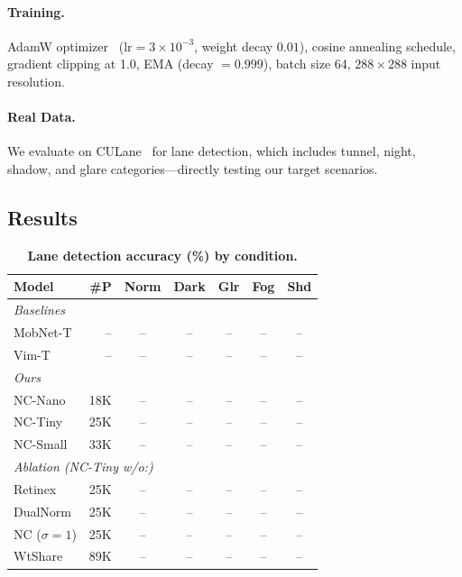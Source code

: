 \documentclass[10pt,twocolumn,letterpaper]{article}
\begin{document}
\paragraph{Training.}
AdamW optimizer~\cite{loshchilov2019decoupled} ($\text{lr}=3 \times 10^{-3}$, weight decay $0.01$), cosine annealing schedule, gradient clipping at 1.0, EMA (decay $= 0.999$), batch size 64, $288 \times 288$ input resolution.

\paragraph{Real Data.}
We evaluate on CULane~\cite{pan2018culane} for lane detection, which includes tunnel, night, shadow, and glare categories---directly testing our target scenarios.

\subsection{Results}

\begin{table}[t]
\centering
\caption{\textbf{Lane detection accuracy (\%) by condition.}}
\label{tab:lane_results}
\setlength{\tabcolsep}{3pt}
\footnotesize
\begin{tabular}{@{}lr ccccc@{}}
\toprule
\textbf{Model} & \textbf{\#P} & \textbf{Norm} & \textbf{Dark} & \textbf{Glr} & \textbf{Fog} & \textbf{Shd} \\
\midrule
\multicolumn{7}{l}{\textit{Baselines}} \\
MobNet-T & -- & -- & -- & -- & -- & -- \\
Vim-T & -- & -- & -- & -- & -- & -- \\
\midrule
\multicolumn{7}{l}{\textit{Ours}} \\
NC-Nano  & 18K & -- & -- & -- & -- & -- \\
NC-Tiny  & 25K & -- & -- & -- & -- & -- \\
NC-Small & 33K & -- & -- & -- & -- & -- \\
\midrule
\multicolumn{7}{l}{\textit{Ablation (NC-Tiny w/o:)}} \\
\;Retinex & 25K & -- & -- & -- & -- & -- \\
\;DualNorm & 25K & -- & -- & -- & -- & -- \\
\;NC ($\sigma{=}1$) & 25K & -- & -- & -- & -- & -- \\
\;WtShare & 89K & -- & -- & -- & -- & -- \\
\bottomrule
\end{tabular}
\end{table}
\end{document}

